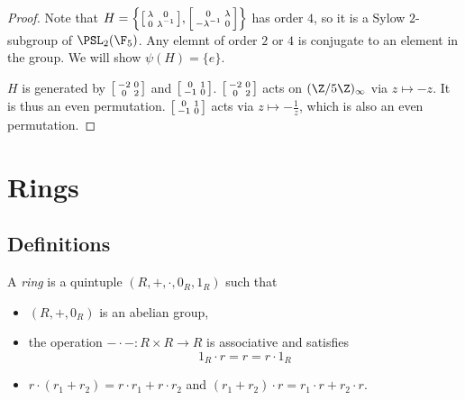 \documentclass[a4paper]{article}
\theoremstyle{definition}
\begin{document}
\begin{eg}
\begin{proof}
    Note that \(H = \left\{ \begin{bsmallmatrix} \lambda & 0 \\ 0 & \lambda^{-1} \end{bsmallmatrix}, \begin{bsmallmatrix} 0 & \lambda \\ -\lambda^{-1} & 0 \end{bsmallmatrix} \right\}\) has order \(4\), so it is a Sylow \(2\)-subgroup of \(\PSL_2(\F_5)\). Any elemnt of order \(2\) or \(4\) is conjugate to an element in the group. We will show \(\psi(H) = \{e\}\).

    \(H\) is generated by \(\begin{bsmallmatrix} -2 & 0 \\ 0 & 2 \end{bsmallmatrix}\) and \(\begin{bsmallmatrix} 0 & 1 \\ -1 & 0 \end{bsmallmatrix}\). \(\begin{bsmallmatrix} -2 & 0 \\ 0 & 2 \end{bsmallmatrix}\) acts on \((\Z/5\Z)_\infty\) via \(z \mapsto -z\). It is thus an even permutation. \(\begin{bsmallmatrix} 0 & 1 \\ -1 & 0 \end{bsmallmatrix}\) acts via \(z \mapsto - \frac{1}{z}\), which is also an even permutation.
  \end{proof}
\end{eg}

\section{Rings}

\subsection{Definitions}

\begin{definition}[Ring]
  A \emph{ring} is a quintuple \((R, +, \cdot, 0_R, 1_R)\) such that
  \begin{itemize}
  \item \((R, +, 0_R)\) is an abelian group,
  \item the operation \(- \cdot -: R \times R \to R\) is associative and satisfies
    \[
      1_R \cdot r = r = r \cdot 1_R
    \]
  \item \(r \cdot (r_1 + r_2) = r \cdot r_1 + r \cdot r_2\) and \((r_1 + r_2) \cdot r = r_1 \cdot r + r_2 \cdot r\).
  \end{itemize}
\end{definition}
\end{document}
